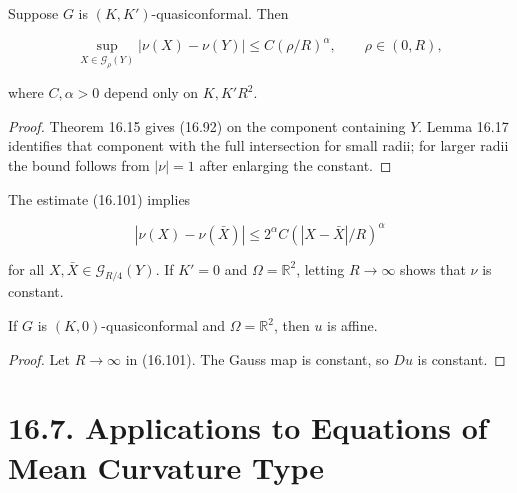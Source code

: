 \begin{theorem}\label{gilbarg-trudinger.thm.16.18.gauss-map-holder}
Suppose $G$ is $(K,K')$-quasiconformal. Then

\begin{equation}
\tag{16.101}
\sup_{X\in\mathscr{G}_{\rho}(Y)}|\nu(X)-\nu(Y)|
\le C(\rho/R)^\alpha,\qquad \rho\in(0,R),
\end{equation}

where $C,\alpha>0$ depend only on $K,K'R^2$.
\end{theorem}
\begin{proof}
\sketch Theorem 16.15 gives (16.92) on the component containing $Y$. Lemma 16.17 identifies that component with the full intersection for small radii; for larger radii the bound follows from $|\nu|=1$ after enlarging the constant.
\end{proof}

\begin{remark}\label{gilbarg-trudinger.remark.16.101-consequences}
The estimate (16.101) implies

\begin{equation}
\tag{16.102}
|\nu(X)-\nu(\bar X)|\le 2^\alpha C(|X-\bar X|/R)^\alpha
\end{equation}

for all $X,\bar X\in\mathscr G_{R/4}(Y)$.  If $K'=0$ and
$\Omega=\mathbb R^2$, letting $R\to\infty$ shows that $\nu$ is constant.
\end{remark}

\begin{corollary}\label{gilbarg-trudinger.cor.16.19.quasiconformal-gauss-map-bernstein}
If $G$ is $(K,0)$-quasiconformal and $\Omega=\mathbb R^2$, then $u$ is affine.
\end{corollary}
\begin{proof}
\sketch Let $R\to\infty$ in (16.101). The Gauss map is constant, so $Du$ is constant.
\end{proof}

\section*{16.7. Applications to Equations of Mean Curvature Type}


